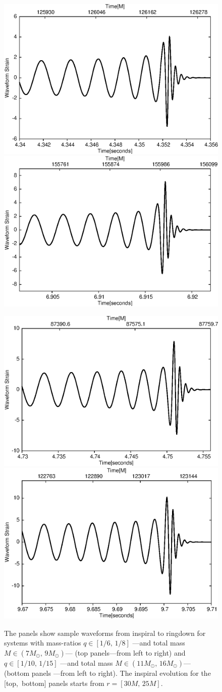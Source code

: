 \begin{figure}[ht]
\centerline{
\includegraphics[height=0.4\textwidth,  clip]{figures/imrimri/wavem1m6complete.eps}
\includegraphics[height=0.4\textwidth,  clip]{figures/imrimri/wavem1m8complete.eps}
}
\centerline{
\includegraphics[height=0.4\textwidth,  clip]{figures/imrimri/wavem1m10complete.eps}
\includegraphics[height=0.4\textwidth,  clip]{figures/imrimri/wavem1m15complete.eps}
}
\caption{The panels show sample waveforms from inspiral to ringdown for systems with mass-ratios \(q\in[1/6,\,1/8]\) ---and total mass  \(M\in( 7M_{\odot},\, 9M_{\odot}) \)--- (top panels---from left to right) and \(q\in[1/10,\, 1/15]\)  ---and total mass  \(M\in( 11M_{\odot},\, 16M_{\odot}) \)--- (bottom panels ---from left to right). The inspiral evolution for the [top,\, bottom] panels starts from  \(r=[30M,\, 25M]\). }
\label{Completewavs}
\end{figure}

